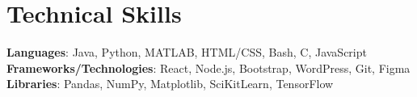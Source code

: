 \section{Technical Skills}
 \begin{itemize}[leftmargin=0.15in, label={}]
    \small{\item{
     \textbf{Languages}{: Java, Python, MATLAB, HTML/CSS, Bash, C, JavaScript} \\
     \textbf{Frameworks/Technologies}{: React, Node.js, Bootstrap, WordPress, Git, Figma} \\
     \textbf{Libraries}{: Pandas, NumPy, Matplotlib, SciKitLearn, TensorFlow}
    }}
 \end{itemize}